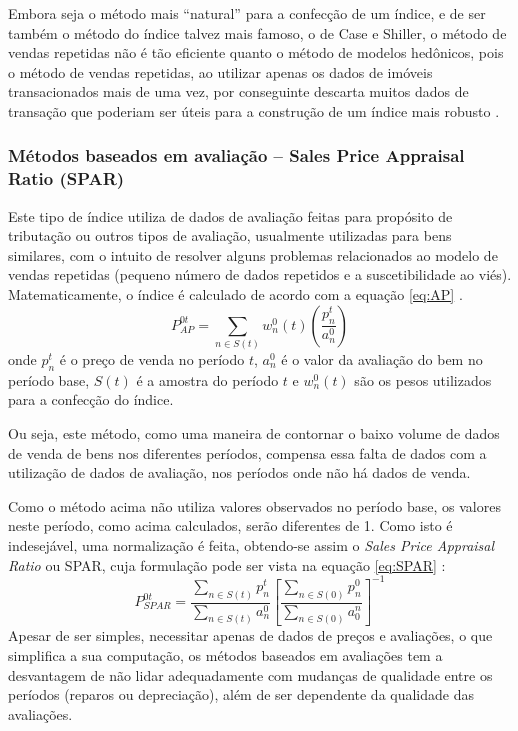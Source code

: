 \documentclass[
	12pt,				%
	oneside,			%
	a4paper,			%
	chapter=TITLE,		%
	section=TITLE,		%
	english,			%
	brazil				%
	]{abntex2}
\begin{document}
Embora seja o método mais ``natural'' para a confecção de um índice, e de ser
também o método do índice talvez mais famoso, o de Case e Shiller, o método de
vendas repetidas não é tão eficiente quanto o método de modelos hedônicos, pois
o método de vendas repetidas, ao utilizar apenas os dados de imóveis
transacionados mais de uma vez, por conseguinte descarta muitos dados de
transação que poderiam ser úteis para a construção de um índice mais robusto
\autocite[160]{rppi}.

\hypertarget{muxe9todos-baseados-em-avaliauxe7uxe3o-sales-price-appraisal-ratio-spar}{%
\subsubsection{Métodos baseados em avaliação -- Sales Price Appraisal Ratio (SPAR)}\label{muxe9todos-baseados-em-avaliauxe7uxe3o-sales-price-appraisal-ratio-spar}}

Este tipo de índice utiliza de dados de avaliação feitas para propósito de
tributação ou outros tipos de avaliação, usualmente utilizadas para bens
similares, com o intuito de resolver alguns problemas relacionados ao modelo de
vendas repetidas (pequeno número de dados repetidos e a suscetibilidade ao viés).
Matematicamente, o índice é calculado de acordo com a equação \eqref{eq:AP}
\autocite[75]{rppi}.
\begin{equation}
P_{AP}^{0t} = \sum_{n \in S(t)} w_n^0(t) \left ( \frac{p_n^t}{a_n^0} \right )
\label{eq:AP}
\end{equation}
onde \(p_n^t\) é o preço de venda no período \(t\), \(a_n^0\) é o valor da avaliação
do bem no período base, \(S(t)\) é a amostra do período \(t\) e \(w_n^0(t)\) são os
pesos utilizados para a confecção do índice.

Ou seja, este método, como uma maneira de contornar o baixo volume de dados de
venda de bens nos diferentes períodos, compensa essa falta de dados com a
utilização de dados de avaliação, nos períodos onde não há dados de venda.

Como o método acima não utiliza valores observados no período base, os valores
neste período, como acima calculados, serão diferentes de 1. Como isto é
indesejável, uma normalização é feita, obtendo-se assim o \emph{Sales Price Appraisal
Ratio} ou SPAR, cuja formulação pode ser vista na equação \eqref{eq:SPAR}
\autocite[75]{rppi}:
\begin{equation}
P_{SPAR}^{0t} = \frac{\sum\limits_{n \in S(t)} p_n^t}{\sum\limits_{n \in S(t)} a_n^0} \left [ \frac{\sum\limits_{n \in S(0)} p_n^0}{\sum\limits_{n \in S(0)} a_0^n} \right ]^{-1}
\label{eq:SPAR}
\end{equation}
Apesar de ser simples, necessitar apenas de dados de preços e avaliações, o que
simplifica a sua computação, os métodos baseados em avaliações tem a desvantagem
de não lidar adequadamente com mudanças de qualidade entre os períodos (reparos
ou depreciação), além de ser dependente da qualidade das avaliações.
\end{document}
